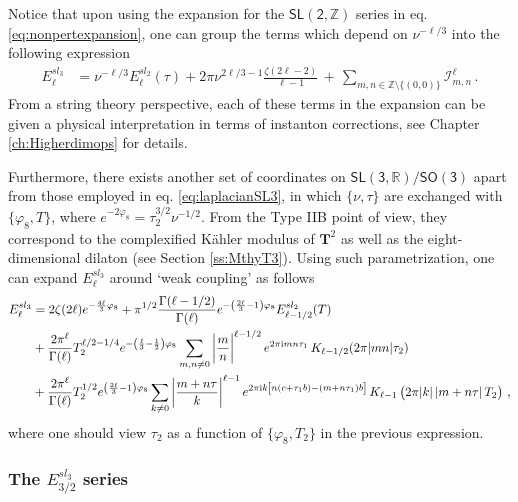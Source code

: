 %
Notice that upon using the expansion for the $\mathsf{SL(2, \mathbb{Z})}$ series in eq. \eqref{eq:nonpertexpansion}, one can group the terms which depend on $\nu^{-\ell/3}$ into the following expression
%
\begin{align}\label{eq:SL3&SL2}
	 E_{\ell}^{sl_3} &= \nu^{-\ell/3} E_{\ell}^{sl_2}(\tau) + 2\pi \nu^{2\ell/3-1} \frac{\zeta(2\ell-2)}{\ell-1}\, +\, \sum_{m, n \in \mathbb{Z} \setminus \lbrace (0,0) \rbrace} \mathcal{I}^\ell_{m, n}\, .
\end{align}
%
From a string theory perspective, each of these terms in the expansion can be given a physical interpretation in terms of instanton corrections, see Chapter \ref{ch:Higherdimops} for details. 

Furthermore, there exists another set of coordinates on $\mathsf{SL(3, \mathbb{R})}/\mathsf{SO(3)}$ apart from those employed in eq. \eqref{eq:laplacianSL3}, in which $\{\nu, \tau\}$ are exchanged with $\{\varphi_8, T\}$, where $e^{-2\varphi_8}=\tau_2^{3/2} \nu^{-1/2}$. From the Type IIB point of view, they correspond to the complexified K\"ahler modulus of $\mathbf{T}^2$ as well as the eight-dimensional dilaton (see Section \ref{ss:MthyT3}). Using such parametrization, one can expand $E_{\ell}^{sl_3}$ around `weak coupling' as follows 
%
\begin{align}\label{eq:instexpSL3-2}
	\notag E_{\ell}^{sl_3} &= 2 \zeta(2\ell) e^{-\frac{4\ell}{3} \varphi_8} + \pi^{1/2} \frac{\Gamma(\ell-1/2)}{\Gamma(\ell)} e^{-\left(\frac{2\ell}{3}-1 \right)\varphi_8} E_{\ell-1/2}^{sl_2} (T)\\
    \notag&+  \frac{2\pi^\ell}{\Gamma(\ell)} T_2^{\ell/2-1/4} e^{-\left(\frac{\ell}{3}-\frac{1}{2} \right)\varphi_8} \sum_{m,n \neq 0} \left| \frac{m}{n}\right|^{\ell-1/2} e^{2\pi \text{i} m n\tau_1}\, K_{\ell-1/2} (2\pi |m n| \tau_2)\\
    &+\frac{2\pi^\ell}{\Gamma(\ell)} T_2^{1/2} e^{\left(\frac{2\ell}{3}-1 \right)\varphi_8} \sum_{k \neq 0} \left| \frac{m+n\tau}{k}\right|^{\ell-1} e^{2\pi \text{i} k \left[n(c+\tau_1 b)- (m+n\tau_1)b \right]}\, K_{\ell-1} \left(2\pi |k| \left| m+n\tau \right| T_2\right)\, ,
\end{align}
%
where one should view $\tau_2$ as a function of $\lbrace\varphi_8, T_2\rbrace$ in the previous expression.

\subsubsection*{The $E_{3/2}^{sl_3}$ series}

